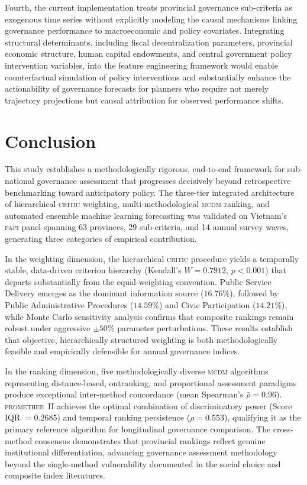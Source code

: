 \documentclass[12pt,a4paper]{article}
\newcommand{\PAPI}{\textsc{papi}\xspace}
\newcommand{\MCDM}{\textsc{mcdm}\xspace}
\newcommand{\CRITIC}{\textsc{critic}\xspace}
\newcommand{\PROMETHEE}{\textsc{promethee}\xspace}
\begin{document}
Fourth, the current implementation treats provincial governance sub-criteria as exogenous time series without explicitly modeling the causal mechanisms linking governance performance to macroeconomic and policy covariates. Integrating structural determinants, including fiscal decentralization parameters, provincial economic structure, human capital endowments, and central government policy intervention variables, into the feature engineering framework would enable counterfactual simulation of policy interventions and substantially enhance the actionability of governance forecasts for planners who require not merely trajectory projections but causal attribution for observed performance shifts.

\section{Conclusion}
\label{sec:conclusion}

This study establishes a methodologically rigorous, end-to-end framework for sub-national governance assessment that progresses decisively beyond retrospective benchmarking toward anticipatory policy. The three-tier integrated architecture of hierarchical \CRITIC weighting, multi-methodological \MCDM ranking, and automated ensemble machine learning forecasting was validated on Vietnam's \PAPI panel spanning 63 provinces, 29 sub-criteria, and 14 annual survey waves, generating three categories of empirical contribution.

In the weighting dimension, the hierarchical \CRITIC procedure yields a temporally stable, data-driven criterion hierarchy (Kendall's $W = 0.7912$, $p < 0.001$) that departs substantially from the equal-weighting convention. Public Service Delivery emerges as the dominant information source ($16.76\%$), followed by Public Administrative Procedures ($14.59\%$) and Civic Participation ($14.21\%$), while Monte Carlo sensitivity analysis confirms that composite rankings remain robust under aggressive $\pm50\%$ parameter perturbations. These results establish that objective, hierarchically structured weighting is both methodologically feasible and empirically defensible for annual governance indices.

In the ranking dimension, five methodologically diverse \MCDM algorithms representing distance-based, outranking, and proportional assessment paradigms produce exceptional inter-method concordance (mean Spearman's $\bar{\rho} = 0.96$). \PROMETHEE~II achieves the optimal combination of discriminatory power (Score IQR $= 0.2685$) and temporal ranking persistence ($\rho = 0.553$), qualifying it as the primary reference algorithm for longitudinal governance comparison. The cross-method consensus demonstrates that provincial rankings reflect genuine institutional differentiation, advancing governance assessment methodology beyond the single-method vulnerability documented in the social choice and composite index literatures.
\end{document}
